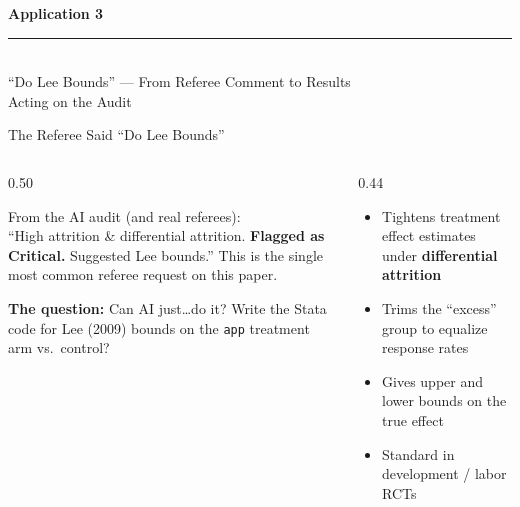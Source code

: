\documentclass[aspectratio=169, 10pt]{beamer}
\begin{document}
{
\begin{frame}
\centering\vfill
{\fontsize{22}{28}\bfseries\selectfont\color{white} Application 3}\\[6pt]
{\color{UVMGold}\rule{5cm}{0.8pt}}\\[6pt]
{\normalsize\color{UVMGold} ``Do Lee Bounds'' --- From Referee Comment to Results}\\[4pt]
{\small\color{PaleSage} Acting on the Audit}
\vfill
\end{frame}
}

\begin{frame}{The Referee Said ``Do Lee Bounds''}
\begin{columns}[T]
\begin{column}{0.50\textwidth}
\begin{tcolorbox}[quotebox]
\small
From the AI audit (and real referees):\\[3pt]
``High attrition \& differential attrition. \textbf{Flagged as Critical.} Suggested Lee bounds.''
\vskip4pt
This is the single most common referee request on this paper.
\end{tcolorbox}
\vskip4pt
\begin{tcolorbox}[accentbox, top=3pt, bottom=3pt]
\small
\textbf{The question:} Can AI just\ldots do it?
\vskip2pt
Write the Stata code for Lee (2009) bounds on the \texttt{app} treatment arm vs.\ control?
\end{tcolorbox}
\end{column}
\begin{column}{0.44\textwidth}
\begin{tcolorbox}[keybox, title={\faBook\quad Lee Bounds}]
\scriptsize
\begin{itemize}\setlength{\itemsep}{2pt}
  \item Tightens treatment effect estimates under \textbf{differential attrition}
  \item Trims the ``excess'' group to equalize response rates
  \item Gives upper and lower bounds on the true effect
  \item Standard in development / labor RCTs
\end{itemize}
\end{tcolorbox}
\end{column}
\end{columns}
\end{frame}
\end{document}
